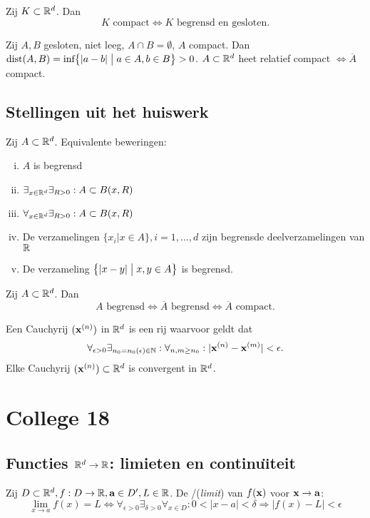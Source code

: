\documentclass{2wa40summary}
\begin{document}
	Zij $K \subset \mathbb{R}^d$. Dan \[K \text{ compact}\Leftrightarrow K \text{ begrensd en gesloten.}\]
	
	\theorem Zij $A,B$ gesloten, niet leeg, $A\cap B = \emptyset$, $A$ compact.
	Dan $\text{dist}(A,B) = \text{inf}\big\{ |a-b| \bigm| a \in A, b \in B \big\} > 0$.
	 $A \subset \mathbb{R}^d$ heet relatief compact $\iff \overline{A}$ compact.
	
	\subsection{Stellingen uit het huiswerk}
	\theorem Zij $A \subset \mathbb{R}^d$. Equivalente beweringen:
	\begin{enumerate}[(i)]
		\item $A$ is begrensd
		\item $\exists _{x \in \mathbb{R}^d} \exists _{R>0}: A \subset B(x,R)$
		\item $\forall _{x \in \mathbb{R}^d} \exists _{R>0}: A \subset B(x,R)$
		\item De verzamelingen $\{ x_i | x \in A \}, i=1,\dots,d$ zijn begrensde deelverzamelingen van $\mathbb{R}$
		\item De verzameling $\big\{|x-y| \bigm| x,y \in A \big\}$ is begrensd.
	\end{enumerate}
	
	\theorem Zij $A \subset \mathbb{R}^d$. Dan \[A \text{ begrensd} \Leftrightarrow \overline{A} \text{ begrensd} \Leftrightarrow \overline{A}\text{ compact}.\]
	
	 Een Cauchyrij $({\textbf{x}}^{(n)})$ in $\mathbb{R}^d$ is een rij waarvoor geldt dat\[\forall _{\epsilon >0} \exists _{n_0=n_0(\epsilon )\in \naturals}:\forall _{n,m \geq n_0}: |\x\up{n}-\x\up{m}| < \epsilon.\]
	\theorem Elke Cauchyrij $({\textbf{x}}^{(n)})\subset\mathbb{R}^d$ is convergent in $\mathbb{R}^d$.
	
	\newpage
	\section{College 18}
	\subsection{Functies $\mathbb{R}^d \rightarrow \mathbb{R}$: limieten en continu\"{\i}teit}
	 Zij $D \subset \mathbb{R}^d, f: D\rightarrow \mathbb{R}, {\textbf{a}} \in D', L\in\mathbb{R}$.
	De /(\textit{limit}) van $f({\textbf{x}})$ voor ${\textbf{x}}\to{\textbf{a}}$:
	\[ \lim_{x\rightarrow a}f(x)=L \Leftrightarrow \forall _{\epsilon >0} \exists _{\delta >0} \forall _{x \in D}: 0<|x-a|<\delta \Rightarrow |f(x)-L|<\epsilon\]
	
\end{document}
